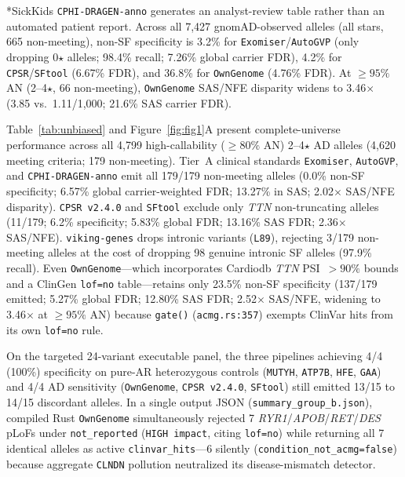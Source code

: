 \documentclass[11pt,letterpaper]{article}
\begin{document}
\begin{table}[!t]
\raggedright\footnotesize{*SickKids \texttt{CPHI-DRAGEN-anno} generates an analyst-review table rather than an automated patient report. Across all 7,427 gnomAD-observed alleles (all stars, 665 non-meeting), non-SF specificity is 3.2\% for \texttt{Exomiser}/\texttt{AutoGVP} (only dropping 0$\star$ alleles; 98.4\% recall; 7.26\% global carrier FDR), 4.2\% for \texttt{CPSR}/\texttt{SFtool} (6.67\% FDR), and 36.8\% for \texttt{OwnGenome} (4.76\% FDR). At $\ge 95\%$ AN (2--4$\star$, 66 non-meeting), \texttt{OwnGenome} SAS/NFE disparity widens to 3.46$\times$ (3.85 vs.\ 1.11/1,000; 21.6\% SAS carrier FDR).}
\end{table}

Table~\ref{tab:unbiased} and Figure~\ref{fig:fig1}A present complete-universe performance across all 4,799 high-callability ($\ge 80\%$ AN) 2--4$\star$ AD alleles (4,620 meeting criteria; 179 non-meeting). Tier~A clinical standards \texttt{Exomiser}, \texttt{AutoGVP}, and \texttt{CPHI-DRAGEN-anno} emit all 179/179 non-meeting alleles (0.0\% non-SF specificity; 6.57\% global carrier-weighted FDR; 13.27\% in SAS; 2.02$\times$ SAS/NFE disparity). \texttt{CPSR v2.4.0} and \texttt{SFtool} exclude only \textit{TTN} non-truncating alleles (11/179; 6.2\% specificity; 5.83\% global FDR; 13.16\% SAS FDR; 2.36$\times$ SAS/NFE). \texttt{viking-genes} drops intronic variants (\texttt{L89}), rejecting 3/179 non-meeting alleles at the cost of dropping 98 genuine intronic SF alleles (97.9\% recall). Even \texttt{OwnGenome}---which incorporates Cardiodb \textit{TTN} PSI~$>90\%$ bounds and a ClinGen \texttt{lof=no} table---retains only 23.5\% non-SF specificity (137/179 emitted; 5.27\% global FDR; 12.80\% SAS FDR; 2.52$\times$ SAS/NFE, widening to 3.46$\times$ at $\ge 95\%$ AN) because \texttt{gate()} (\texttt{acmg.rs:357}) exempts ClinVar hits from its own \texttt{lof=no} rule.

On the targeted 24-variant executable panel, the three pipelines achieving 4/4 (100\%) specificity on pure-AR heterozygous controls (\texttt{MUTYH}, \texttt{ATP7B}, \texttt{HFE}, \texttt{GAA}) and 4/4 AD sensitivity (\texttt{OwnGenome}, \texttt{CPSR v2.4.0}, \texttt{SFtool}) still emitted 13/15 to 14/15 discordant alleles. In a single output JSON (\texttt{summary\_group\_b.json}), compiled Rust \texttt{OwnGenome} simultaneously rejected 7 \textit{RYR1}/\textit{APOB}/\textit{RET}/\textit{DES} pLoFs under \texttt{not\_reported} (\texttt{HIGH impact}, citing \texttt{lof=no}) while returning all 7 identical alleles as active \texttt{clinvar\_hits}---6 silently (\texttt{condition\_not\_acmg=false}) because aggregate \texttt{CLNDN} pollution neutralized its disease-mismatch detector.
\end{document}
